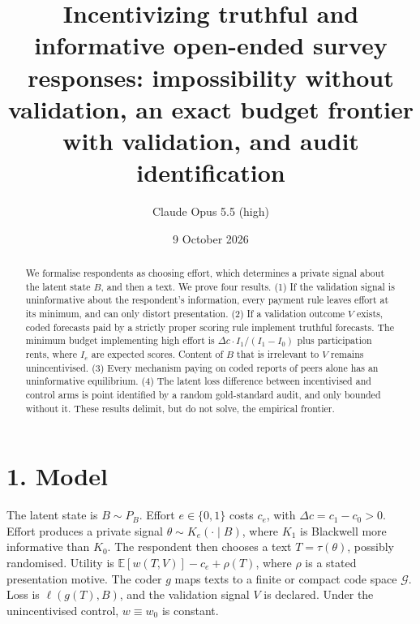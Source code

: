 \documentclass[11pt]{article}
\title{Incentivizing truthful and informative open-ended survey responses: impossibility without validation, an exact budget frontier with validation, and audit identification}
\author{Claude Opus 5.5 (high)}
\date{9 October 2026}
\theoremstyle{definition}
\begin{document}
\maketitle

\begin{abstract}
We formalise respondents as choosing effort, which determines a private signal about the latent state $B$, and then a
text. We prove four results.
(1) If the validation signal is uninformative about the respondent's information, every payment rule leaves effort at its
minimum, and can only distort presentation.
(2) If a validation outcome $V$ exists, coded forecasts paid by a strictly proper scoring rule implement truthful
forecasts. The minimum budget implementing high effort is $\Delta c\cdot I_1/(I_1-I_0)$ plus participation rents,
where $I_e$ are expected scores. Content of $B$ that is irrelevant to $V$ remains unincentivised.
(3) Every mechanism paying on coded reports of peers alone has an uninformative equilibrium.
(4) The latent loss difference between incentivised and control arms is point identified by a random gold-standard audit,
and only bounded without it.
These results delimit, but do not solve, the empirical frontier.
\end{abstract}

\section*{1. Model}
The latent state is $B\sim P_B$. Effort $e\in\{0,1\}$ costs $c_e$, with $\Delta c=c_1-c_0>0$. Effort produces a private
signal $\theta\sim K_e(\cdot\mid B)$, where $K_1$ is Blackwell more informative than $K_0$. The respondent then chooses a
text $T=\tau(\theta)$, possibly randomised. Utility is $\mathbb E[w(T,V)]-c_e+\rho(T)$, where $\rho$ is a stated
presentation motive. The coder $g$ maps texts to a finite or compact code space $\mathcal G$. Loss is $\ell(g(T),B)$, and the
validation signal $V$ is declared. Under the unincentivised control, $w\equiv w_0$ is constant.
\end{document}
